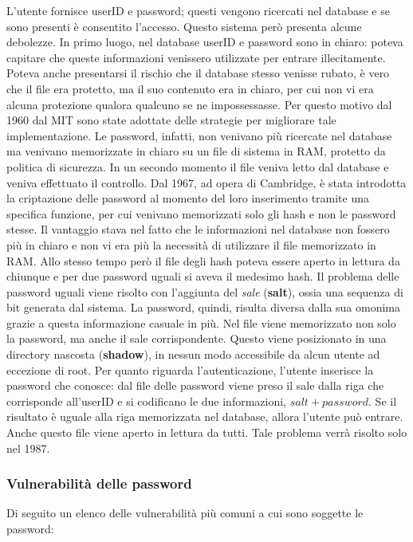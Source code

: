 L'utente fornisce userID e password; questi vengono ricercati nel database e se
sono presenti è consentito l'accesso.
Questo sistema però presenta alcune debolezze. In primo luogo, nel database
userID e password sono in chiaro: poteva capitare che queste informazioni
venissero utilizzate per entrare illecitamente. Poteva anche presentarsi il
rischio che il database stesso venisse rubato, è vero che il file era protetto,
ma il suo contenuto era in chiaro, per cui non vi era alcuna protezione qualora
qualcuno se ne impossessasse. Per questo motivo dal 1960 dal MIT sono state
adottate delle strategie per migliorare tale implementazione. Le password,
infatti, non venivano più ricercate nel database ma venivano memorizzate in
chiaro su un file di sistema in RAM, protetto da politica di sicurezza.
In un secondo momento il file veniva letto dal database e veniva effettuato
il controllo.
Dal 1967, ad opera di Cambridge, è stata introdotta la criptazione delle password
al momento del loro inserimento tramite una specifica funzione, per cui venivano
memorizzati solo gli hash e non le password stesse.
Il vantaggio stava nel fatto che le informazioni nel database non fossero più in
chiaro e non vi era più la necessità di utilizzare il file memorizzato in RAM.
Allo stesso tempo però il file degli hash poteva essere aperto in lettura da
chiunque e per due password uguali si aveva il medesimo hash.
Il problema delle password uguali viene risolto con l'aggiunta del \textit{sale}
(\textbf{salt}), ossia una sequenza di bit generata dal sistema. La password,
quindi, risulta diversa dalla sua omonima grazie a questa informazione casuale
in più.
Nel file viene memorizzato non solo la password, ma anche il sale corrispondente.
Questo viene posizionato in una directory nascosta (\textbf{shadow}), in nessun
modo accessibile da alcun utente ad eccezione di root.
Per quanto riguarda l'autenticazione, l'utente inserisce la password che conosce:
dal file delle password viene preso il sale dalla riga che corrisponde all'userID
e si codificano le due informazioni, \(salt + password\). Se il risultato è
uguale alla riga memorizzata nel database, allora l'utente può entrare.
Anche questo file viene aperto in lettura da tutti.
Tale problema verrà risolto solo nel 1987.

\subsubsection{Vulnerabilità delle password}
Di seguito un elenco delle vulnerabilità più comuni a cui sono soggette le
password:

